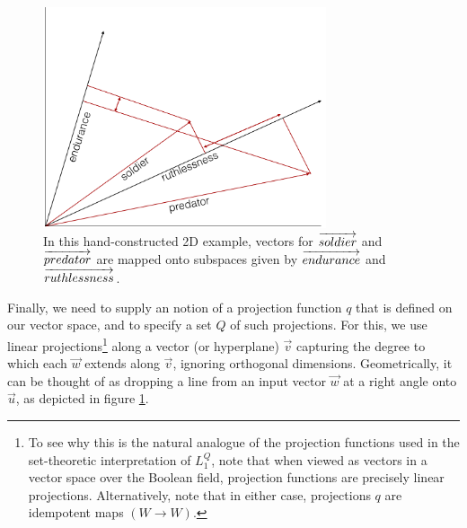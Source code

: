 \documentclass[OpenMind]{stjour}
\newcommand{\Listener}{L}
\newcommand{\QLONE}{\Listener_{{1}}^{{Q}}}
\begin{document}
		\begin{figure}
		\centering
			\includegraphics[height=6.5cm]{images/diagram2.png}
			\caption{In this hand-constructed 2D example, vectors for $\protect\overrightarrow{soldier}$ and $\protect\overrightarrow{predator}$ are mapped onto subspaces given by $\protect\overrightarrow{endurance}$ and $\protect\overrightarrow{ruthlessness}$.}
			\label{fig:1}
		\end{figure}

		Finally, we need to supply an notion of a projection function $q$ that is defined on our vector space, and to specify a set $Q$ of such projections. 
		For this, we use linear projections\footnote{To see why this is the natural analogue of the projection functions used in the set-theoretic interpretation of $\QLONE$, note that when viewed as vectors in a vector space over the Boolean field, projection functions are precisely linear projections. Alternatively, note that in either case, projections $q$ are idempotent maps $(W\to W)$.} along a vector (or hyperplane) $\overrightarrow{v}$ 
		capturing the degree to which each $\overrightarrow{w}$ extends along $\overrightarrow{v}$, ignoring orthogonal dimensions. Geometrically, it can be thought of as dropping a line from an input vector $\overrightarrow{w}$ at a right angle onto $\overrightarrow{u}$, as depicted in figure \ref{fig:1}.
\end{document}
